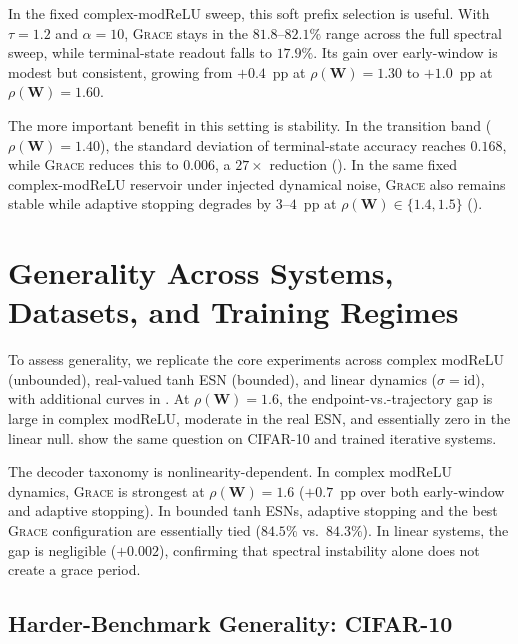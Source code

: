 \documentclass{article}
\theoremstyle{remark}
\newcommand{\bW}{\mathbf{W}}
\newcommand{\grace}{\textnormal{\textsc{Grace}}}
\newcommand{\sr}{\rho(\bW)}
\begin{document}
In the fixed complex-modReLU sweep, this soft prefix selection is useful. With
$\tau = 1.2$ and $\alpha = 10$, \grace{} stays in the $81.8$--$82.1\%$ range
across the full spectral sweep, while terminal-state readout falls to
$17.9\%$. Its gain over early-window is modest but consistent, growing from
$+0.4$~pp at $\sr = 1.30$ to $+1.0$~pp at $\sr = 1.60$.

The more important benefit in this setting is stability. In the transition
band ($\sr = 1.40$), the standard deviation of terminal-state accuracy reaches
$0.168$, while \grace{} reduces this to $0.006$, a $27\times$ reduction
(). In the same fixed complex-modReLU reservoir under
injected dynamical noise, \grace{} also remains stable while adaptive stopping degrades by $3$--$4$~pp at
$\sr \in \{1.4, 1.5\}$ ().


\section{Generality Across Systems, Datasets, and Training Regimes}
\label{sec:cross_system}

To assess generality, we replicate the core experiments across complex modReLU
(unbounded), real-valued tanh ESN (bounded), and linear dynamics
($\sigma=\text{id}$), with additional curves in . At
$\sr=1.6$, the endpoint-vs.-trajectory gap is large in complex modReLU,
moderate in the real ESN, and essentially zero in the linear null.
 show the same
question on CIFAR-10 and trained iterative systems.

The decoder taxonomy is nonlinearity-dependent. In complex modReLU dynamics,
\grace{} is strongest at $\sr=1.6$ ($+0.7$~pp over both early-window and
adaptive stopping). In bounded tanh ESNs, adaptive stopping and the best
\grace{} configuration are essentially tied ($84.5\%$ vs.\ $84.3\%$). In
linear systems, the gap is negligible ($+0.002$), confirming that spectral
instability alone does not create a grace period.

\subsection{Harder-Benchmark Generality: CIFAR-10}
\label{sec:cifar10}
\end{document}
